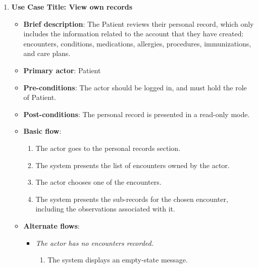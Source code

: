 \begin{enumerate}
\vspace{0.5em}

\item \textbf{Use Case Title: View own records}
\begin{itemize}
    \item \textbf{Brief description}: The Patient reviews their personal record, which only includes the information related to the account that they have created: encounters, conditions, medications, allergies, procedures, immunizations, and care plans.
    \item \textbf{Primary actor}: Patient
    \item \textbf{Pre-conditions}: The actor should be logged in, and must hold the role of Patient.
    \item \textbf{Post-conditions}: The personal record is presented in a read-only mode.
    \item \textbf{Basic flow}:
    \begin{enumerate}
        \item The actor goes to the personal records section.
        \item The system presents the list of encounters owned by the actor.
        \item The actor chooses one of the encounters.
        \item The system presents the sub-records for the chosen encounter, including the observations associated with it.
    \end{enumerate}
    \item \textbf{Alternate flows}:
    \begin{itemize}
        \item[2a.] \textit{The actor has no encounters recorded.}
        \begin{enumerate}
            \item The system displays an empty-state message.
        \end{enumerate}
    \end{itemize}
\end{itemize}

\end{enumerate}

